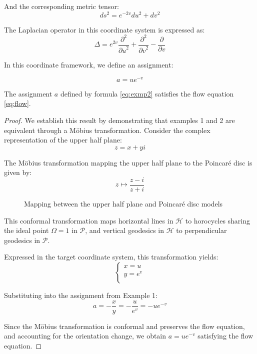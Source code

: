 And the corresponding metric tensor:
$$
ds^2 = e^{-2v} du^2 + dv^2
$$

The Laplacian operator in this coordinate system is expressed as:
$$
\Delta = e^{2v} \frac{\partial^2}{{\partial u}^2} + \frac{\partial^2}{{\partial v}^2} - \frac{\partial}{\partial v}
$$

In this coordinate framework, we define an assignment:

\begin{equation}\label{eq:exmp2}
a = u e^{-v}
\end{equation}

\begin{theorem}\label{thm:exmp2}
The assignment $a$ defined by formula \eqref{eq:exmp2} satisfies the flow equation \eqref{eq:flow}.
\end{theorem}

\begin{proof}
We establish this result by demonstrating that examples 1 and 2 are equivalent through a Möbius transformation. Consider the complex representation of the upper half plane:
$$
z = x + yi
$$

The Möbius transformation mapping the upper half plane to the Poincaré disc is given by:
$$
z \mapsto \frac{z-i}{z+i}
$$

\begin{figure}[ht]
\centering
{}
\caption{Mapping between the upper half plane and Poincaré disc models}\label{fig:mapping}
\end{figure}

This conformal transformation maps horizontal lines in $\mathcal{H}$ to horocycles sharing the ideal point $\Omega = 1$ in $\mathcal{P}$, and vertical geodesics in $\mathcal{H}$ to perpendicular geodesics in $\mathcal{P}$.

Expressed in the target coordinate system, this transformation yields:
$$
\begin{cases}
x = u\\
y = e^v \\
\end{cases}
$$

Substituting into the assignment from Example 1:
$$
a = -\frac{x}{y} = -\frac{u}{e^v} = -u e^{-v}
$$

Since the Möbius transformation is conformal and preserves the flow equation, and accounting for the orientation change, we obtain $a = u e^{-v}$ satisfying the flow equation.
\end{proof}

